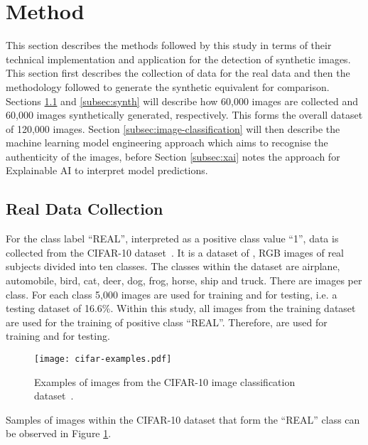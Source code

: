 \documentclass{article}
\begin{document}
\section{Method}
\label{sec:method}
This section describes the methods followed by this study in terms of their technical implementation and application for the detection of synthetic images. This section first describes the collection of data for the real data and then the methodology followed to generate the synthetic equivalent for comparison. Sections \ref{subsec:real} and \ref{subsec:synth} will describe how 60,000 images are collected and 60,000 images synthetically generated, respectively. This forms the overall dataset of 120,000 images. Section \ref{subsec:image-classification} will then describe the machine learning model engineering approach which aims to recognise the authenticity of the images, before Section \ref{subsec:xai} notes the approach for Explainable AI to interpret model predictions. 

\subsection{Real Data Collection}
\label{subsec:real}


For the class label ``REAL'', interpreted as a positive class value ``1'', data is collected from the CIFAR-10 dataset~\cite{krizhevsky2009learning}. It is a dataset of ,  RGB images of real subjects divided into ten classes. The classes within the dataset are airplane, automobile, bird, cat, deer, dog, frog, horse, ship and truck. There are  images per class. For each class 5,000 images are used for training and  for testing, i.e. a testing dataset of 16.6\%. Within this study, all images from the training dataset are used for the training of positive class ``REAL''. Therefore,  are used for training and  for testing. 
\begin{figure}
    \centering
    \texttt{[image: cifar-examples.pdf]}
    \caption{Examples of images from the CIFAR-10 image classification dataset~\cite{krizhevsky2009learning}.}
    \label{fig:cifar-examples}
\end{figure}
Samples of images within the CIFAR-10 dataset that form the ``REAL'' class can be observed in Figure \ref{fig:cifar-examples}.
\end{document}
